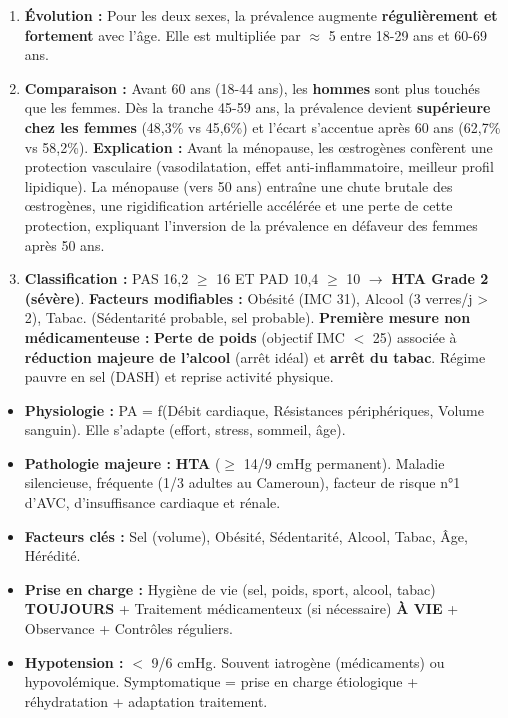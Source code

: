 \documentclass[11pt]{article}
\begin{document}
\begin{corrige}[Exercice n°1]
\begin{enumerate}
    \item \textbf{Évolution :} Pour les deux sexes, la prévalence augmente \textbf{régulièrement et fortement} avec l'âge. Elle est multipliée par $\approx$ 5 entre 18-29 ans et 60-69 ans.
    \item \textbf{Comparaison :} Avant 60 ans (18-44 ans), les \textbf{hommes} sont plus touchés que les femmes. Dès la tranche 45-59 ans, la prévalence devient \textbf{supérieure chez les femmes} (48,3\% vs 45,6\%) et l'écart s'accentue après 60 ans (62,7\% vs 58,2\%).
    \textbf{Explication :} Avant la ménopause, les œstrogènes confèrent une protection vasculaire (vasodilatation, effet anti-inflammatoire, meilleur profil lipidique). La ménopause (vers 50 ans) entraîne une chute brutale des œstrogènes, une rigidification artérielle accélérée et une perte de cette protection, expliquant l'inversion de la prévalence en défaveur des femmes après 50 ans.
    \item \textbf{Classification :} PAS 16,2 $\ge$ 16 ET PAD 10,4 $\ge$ 10 $\rightarrow$ \textbf{HTA Grade 2 (sévère)}.
    \textbf{Facteurs modifiables :} Obésité (IMC 31), Alcool (3 verres/j > 2), Tabac. (Sédentarité probable, sel probable).
    \textbf{Première mesure non médicamenteuse :} \textbf{Perte de poids} (objectif IMC $<$ 25) associée à \textbf{réduction majeure de l'alcool} (arrêt idéal) et \textbf{arrêt du tabac}. Régime pauvre en sel (DASH) et reprise activité physique.
\end{enumerate}
\end{corrige}

\begin{aretenir}
\begin{itemize}
    \item \textbf{Physiologie :} PA = f(Débit cardiaque, Résistances périphériques, Volume sanguin). Elle s'adapte (effort, stress, sommeil, âge).
    \item \textbf{Pathologie majeure :} \textbf{HTA} ($\ge$ 14/9 cmHg permanent). Maladie silencieuse, fréquente (1/3 adultes au Cameroun), facteur de risque n°1 d'AVC, d'insuffisance cardiaque et rénale.
    \item \textbf{Facteurs clés :} Sel (volume), Obésité, Sédentarité, Alcool, Tabac, Âge, Hérédité.
    \item \textbf{Prise en charge :} Hygiène de vie (sel, poids, sport, alcool, tabac) \textbf{TOUJOURS} + Traitement médicamenteux (si nécessaire) \textbf{À VIE} + Observance + Contrôles réguliers.
    \item \textbf{Hypotension :} $<$ 9/6 cmHg. Souvent iatrogène (médicaments) ou hypovolémique. Symptomatique = prise en charge étiologique + réhydratation + adaptation traitement.
\end{itemize}
\end{aretenir}
\end{document}
